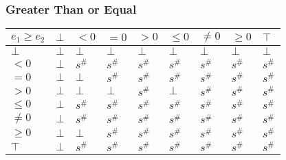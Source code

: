 \documentclass{beamer}
\begin{document}
                                \begin{frame}
                                    \frametitle{Greater Than or Equal}
                \begin{table}
                    \begin{tabular}{|l|l|l|l|l|l|l|l|l|}
                    \hline
                    $e_1 \ge e_2$ & $\bot$ & $<0$   & $=0$   & $>0$   & $\le 0$ & $\ne 0$ & $\ge 0$ & $\top$ \\ \hline
                    $\bot$        & $\bot$ & $\bot$ & $\bot$ & $\bot$ & $\bot$  & $\bot$  & $\bot$  & $\bot$ \\ \hline
                    $<0$          & $\bot$ & $s^\#$ & $s^\#$ & $s^\#$ & $s^\#$  & $s^\#$  & $s^\#$  & $s^\#$ \\ \hline
                    $=0$          & $\bot$ & $\bot$ & $s^\#$ & $s^\#$ & $s^\#$  & $s^\#$  & $s^\#$  & $s^\#$ \\ \hline
                    $>0$          & $\bot$ & $\bot$ & $\bot$ & $s^\#$ & $\bot$  & $s^\#$  & $s^\#$  & $s^\#$ \\ \hline
                    $\le 0$       & $\bot$ & $s^\#$ & $s^\#$ & $s^\#$ & $s^\#$  & $s^\#$  & $s^\#$  & $s^\#$ \\ \hline
                    $\ne 0$       & $\bot$ & $s^\#$ & $s^\#$ & $s^\#$ & $s^\#$  & $s^\#$  & $s^\#$  & $s^\#$ \\ \hline
                    $\ge 0$       & $\bot$ & $\bot$ & $s^\#$ & $s^\#$ & $s^\#$  & $s^\#$  & $s^\#$  & $s^\#$ \\ \hline
                    $\top$        & $\bot$ & $s^\#$ & $s^\#$ & $s^\#$ & $s^\#$  & $s^\#$  & $s^\#$  & $s^\#$ \\ \hline
                    \end{tabular}
                    \end{table}
                \end{frame}
\end{document}
